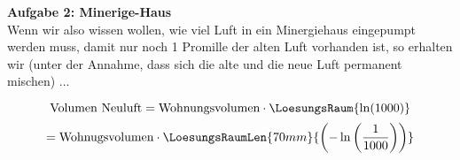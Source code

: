 \textbf{Aufgabe 2: Minerige-Haus}\\
Wenn wir also wissen wollen, wie viel Luft in ein Minergiehaus
eingepumpt werden muss, damit nur noch 1 Promille der alten Luft
vorhanden ist, so erhalten wir (unter der Annahme, dass sich die alte
und die neue Luft permanent mischen) ...

$$\text{Volumen Neuluft} = \text{Wohnungsvolumen} \cdot{}
\LoesungsRaum{\ln(1000)}$$
\vspace{7mm}
$$= \text{Wohnugsvolumen} \cdot{} \LoesungsRaumLen{70mm}{\left( -\ln \left( \frac1{1000}  \right) \right)}$$


\newpage
